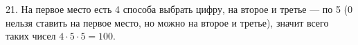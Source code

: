 21. На первое место есть 4 способа выбрать цифру, на второе и третье --- по 5 (0 нельзя ставить на первое место, но можно на второе и третье), значит всего таких чисел $4\cdot5\cdot5=100.$\\
